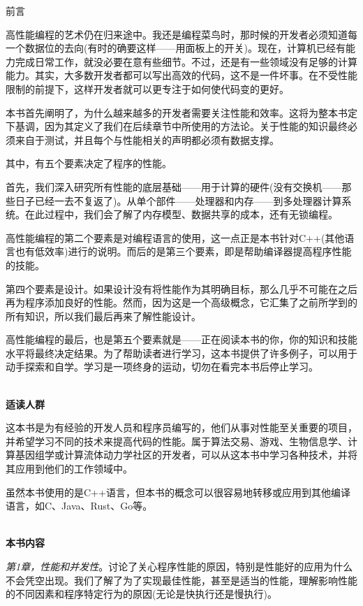 \begin{flushright}
 前言
\end{flushright}

高性能编程的艺术仍在归来途中。我还是编程菜鸟时，那时候的开发者必须知道每一个数据位的去向(有时的确要这样——用面板上的开关)。现在，计算机已经有能力完成日常工作，就没必要在意有些细节。不过，还是有一些领域没有足够的计算能力。其实，大多数开发者都可以写出高效的代码，这不是一件坏事。在不受性能限制的前提下，这样开发者就可以更专注于如何使代码变的更好。

本书首先阐明了，为什么越来越多的开发者需要关注性能和效率。这将为整本书定下基调，因为其定义了我们在后续章节中所使用的方法论。关于性能的知识最终必须来自于测试，并且每个与性能相关的声明都必须有数据支撑。

其中，有五个要素决定了程序的性能。

首先，我们深入研究所有性能的底层基础——用于计算的硬件(没有交换机——那些日子已经一去不复返了)。从单个部件——处理器和内存——到多处理器计算系统。在此过程中，我们会了解了内存模型、数据共享的成本，还有无锁编程。

高性能编程的第二个要素是对编程语言的使用，这一点正是本书针对C++(其他语言也有低效率)进行的说明。而后的是第三个要素，即是帮助编译器提高程序性能的技能。

第四个要素是设计。如果设计没有将性能作为其明确目标，那么几乎不可能在之后再为程序添加良好的性能。然而，因为这是一个高级概念，它汇集了之前所学到的所有知识，所以我们最后再来了解性能设计。

高性能编程的最后，也是第五个要素就是——正在阅读本书的你，你的知识和技能水平将最终决定结果。为了帮助读者进行学习，这本书提供了许多例子，可以用于动手探索和自学。学习是一项终身的运动，切勿在看完本书后停止学习。

\hspace*{\fill} \\ %
\noindent\textbf{适读人群}

这本书是为有经验的开发人员和程序员编写的，他们从事对性能至关重要的项目，并希望学习不同的技术来提高代码的性能。属于算法交易、游戏、生物信息学、计算基因组学或计算流体动力学社区的开发者，可以从这本书中学习各种技术，并将其应用到他们的工作领域中。

虽然本书使用的是C++语言，但本书的概念可以很容易地转移或应用到其他编译语言，如C、Java、Rust、Go等。

\hspace*{\fill} \\ %
\textbf{本书内容}

\textit{第1章，性能和并发性}。讨论了关心程序性能的原因，特别是性能好的应用为什么不会凭空出现。我们了解了为了实现最佳性能，甚至是适当的性能，理解影响性能的不同因素和程序特定行为的原因(无论是快执行还是慢执行)。

